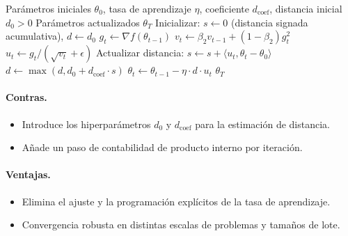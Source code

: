\begin{algorithm}[H]
\caption{Prodigy (Approximating the Distance Estimate)}
\label{alg:prodigy}
\begin{algorithmic}[1]
\Require Parámetros iniciales $\theta_0$, tasa de aprendizaje $\eta$, coeficiente $d_{\text{coef}}$, distancia inicial $d_0 > 0$
\Ensure Parámetros actualizados $\theta_T$
\State Inicializar: $s \gets 0$ (distancia signada acumulativa), $d \gets d_0$
    \State $g_t \gets \nabla f(\theta_{t-1})$
    \State $v_t \gets \beta_2 v_{t-1} + (1-\beta_2) g_t^2$ 
    \State $u_t \gets g_t / (\sqrt{v_t} + \epsilon)$ 
    \State Actualizar distancia: $s \gets s + \langle u_t, \theta_t - \theta_0 \rangle$ 
    \State $d \gets \max(d, d_0 + d_{\text{coef}} \cdot s)$ 
    \State $\theta_t \gets \theta_{t-1} - \eta \cdot d \cdot u_t$ 
\EndFor
\Return $\theta_T$
\end{algorithmic}
\end{algorithm}

\paragraph{Contras.}
\begin{itemize}[leftmargin=*]
\item Introduce los hiperparámetros $d_0$ y $d_{\text{coef}}$ para la estimación de distancia.
\item Añade un paso de contabilidad de producto interno por iteración.
\end{itemize}

\paragraph{Ventajas.}
\begin{itemize}[leftmargin=*]
\item Elimina el ajuste y la programación explícitos de la tasa de aprendizaje.
\item Convergencia robusta en distintas escalas de problemas y tamaños de lote.
\end{itemize}


